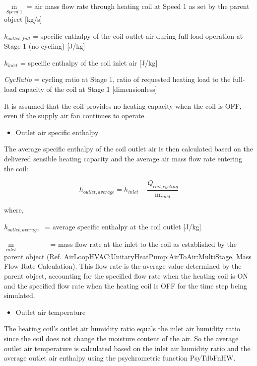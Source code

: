 \({\mathop m\limits^\cdot_{Speed\,\,1}}\) = air mass flow rate through heating coil at Speed 1 as set by the parent object {[}kg/s{]}

\emph{h\(_{outlet,full}\)} = specific enthalpy of the coil outlet air during full-load operation at Stage 1 (no cycling) {[}J/kg{]}

\emph{h\(_{inlet}\)} = specific enthalpy of the coil inlet air {[}J/kg{]}

\emph{CycRatio} = cycling ratio at Stage 1, ratio of requested heating load to the full-load capacity of the coil at Stage 1 {[}dimensionless{]}

It is assumed that the coil provides no heating capacity when the coil is OFF, even if the supply air fan continues to operate.

\begin{itemize}
  \item Outlet air specific enthalpy
\end{itemize}

The average specific enthalpy of the coil outlet air is then calculated based on the delivered sensible heating capacity and the average air mass flow rate entering the coil:

\begin{equation}
  h_{outlet,average} = h_{inlet} - \frac{Q_{coil,cycling}}{{\mathop m\limits^\cdot }_{inlet}}
\end{equation}

where,

\emph{h\(_{outlet,average}\)}~ = average specific enthalpy at the coil outlet {[}J/kg{]}

\({\mathop m\limits^\cdot_{inlet}}\) ~~~~~~~~ = mass flow rate at the inlet to the coil as established by the parent object (Ref. AirLoopHVAC:UnitaryHeatPump:AirToAir:MultiStage, Mass Flow Rate Calculation). This flow rate is the average value determined by the parent object, accounting for the specified flow rate when the heating coil is ON and the specified flow rate when the heating coil is OFF for the time step being simulated.

\begin{itemize}
  \item Outlet air temperature
\end{itemize}

The heating coil's outlet air humidity ratio equals the inlet air humidity ratio since the coil does not change the moisture content of the air. So the average outlet air temperature is calculated based on the inlet air humidity ratio and the average outlet air enthalpy using the psychrometric function PsyTdbFnHW.

